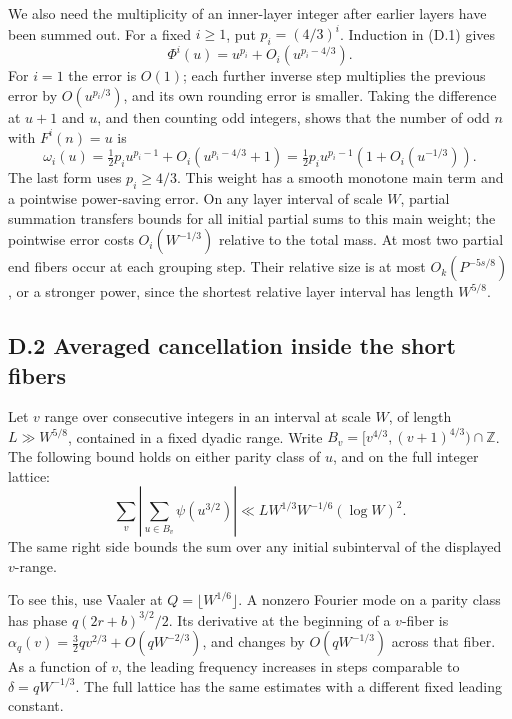 \documentclass[11pt,a4paper]{article}
\begin{document}
We also need the multiplicity of an inner-layer integer after earlier
layers have been summed out. For a fixed \(i\ge1\), put \(p_i=(4/3)^i\).
Induction in (D.1) gives \[
\Phi^i(u)=u^{p_i}+O_i(u^{p_i-4/3}).
\] For \(i=1\) the error is \(O(1)\); each further inverse step
multiplies the previous error by \(O(u^{p_i/3})\), and its own rounding
error is smaller. Taking the difference at \(u+1\) and \(u\), and then
counting odd integers, shows that the number of odd \(n\) with
\(F^i(n)=u\) is \[
\omega_i(u)=\tfrac12p_i u^{p_i-1}
 +O_i(u^{p_i-4/3}+1)
 =\tfrac12p_i u^{p_i-1}(1+O_i(u^{-1/3})).
\tag{D.4}
\] The last form uses \(p_i\ge4/3\). This weight has a smooth monotone
main term and a pointwise power-saving error. On any layer interval of
scale \(W\), partial summation transfers bounds for all initial partial
sums to this main weight; the pointwise error costs \(O_i(W^{-1/3})\)
relative to the total mass. At most two partial end fibers occur at each
grouping step. Their relative size is at most \(O_k(P^{-5s/8})\), or a
stronger power, since the shortest relative layer interval has length
\(W^{5/8}\).

\subsection{D.2 Averaged cancellation inside the short
fibers}\label{d.2-averaged-cancellation-inside-the-short-fibers}

Let \(v\) range over consecutive integers in an interval at scale \(W\),
of length \(L\gg W^{5/8}\), contained in a fixed dyadic range. Write
\(B_v=[v^{4/3},(v+1)^{4/3})\cap\mathbb Z\). The following bound holds on
either parity class of \(u\), and on the full integer lattice: \[
\sum_v\left|\sum_{u\in B_v}\psi(u^{3/2})\right|
 \ll L W^{1/3}W^{-1/6}(\log W)^2.
\tag{D.5}
\] The same right side bounds the sum over any initial subinterval of
the displayed \(v\)-range.

To see this, use Vaaler at \(Q=\lfloor W^{1/6}\rfloor\). A nonzero
Fourier mode on a parity class has phase \(q(2r+b)^{3/2}/2\). Its
derivative at the beginning of a \(v\)-fiber is
\(\alpha_q(v)=\tfrac32qv^{2/3}+O(qW^{-2/3})\), and changes by
\(O(qW^{-1/3})\) across that fiber. As a function of \(v\), the leading
frequency increases in steps comparable to \(\delta=qW^{-1/3}\). The
full lattice has the same estimates with a different fixed leading
constant.
\end{document}
